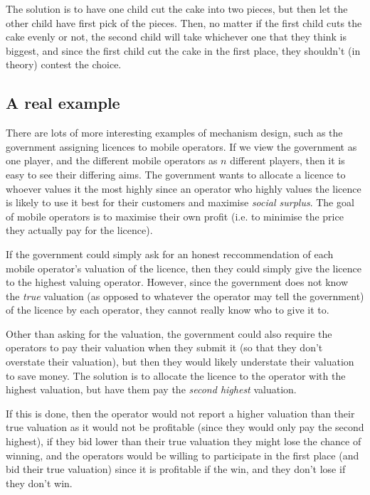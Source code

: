 
The solution is to have one child cut the cake into two pieces, but
then let the other child have first pick of the pieces. Then, no
matter if the first child cuts the cake evenly or not, the second
child will take whichever one that they think is biggest, and since
the first child cut the cake in the first place, they shouldn't (in
theory) contest the choice.

\subsection{A real example}

There are lots of more interesting examples of mechanism design, such
as the government assigning licences to mobile operators. If we view
the government as one player, and the different mobile operators as
$n$ different players, then it is easy to see their differing aims.
The government wants to allocate a licence to whoever values it the
most highly since an operator who highly values the licence is likely
to use it best for their customers and maximise \textit{social
surplus}. The goal of mobile operators is to maximise their own profit
(i.e. to minimise the price they actually pay for the licence).

If the government could simply ask for an honest reccommendation of
each mobile operator's valuation of the licence, then they could
simply give the licence to the highest valuing operator. However,
since the government does not know the \textit{true} valuation (as
opposed to whatever the operator may tell the government) of the
licence by each operator, they cannot really know who to give it to.

Other than asking for the valuation, the government could also require
the operators to pay their valuation when they submit it (so that they
don't overstate their valuation), but then they would likely
understate their valuation to save money. The solution is to allocate
the licence to the operator with the highest valuation, but have them
pay the \textit{second highest} valuation.

If this is done, then the operator would not report a higher valuation
than their true valuation as it would not be profitable (since they
would only pay the second highest), if they bid lower than their true
valuation they might lose the chance of winning, and the operators
would be willing to participate in the first place (and bid their true
valuation) since it is profitable if the win, and they don't lose if
they don't win.

